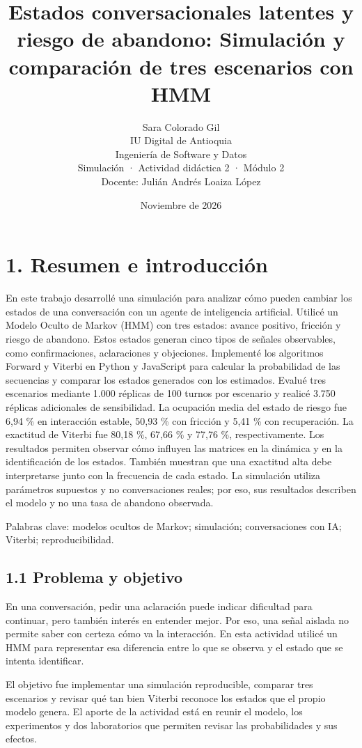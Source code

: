\documentclass[10pt,a4paper]{article}
\title{Estados conversacionales latentes y riesgo de abandono: Simulación y comparación de tres escenarios con HMM}
\author{Sara Colorado Gil\\IU Digital de Antioquia\\Ingeniería de Software y Datos\\Simulación · Actividad didáctica 2 · Módulo 2\\Docente: Julián Andrés Loaiza López}
\date{Noviembre de 2026}
\begin{document}
\maketitle\newpage
\section*{1. Resumen e introducción}
En este trabajo desarrollé una simulación para analizar cómo pueden cambiar los estados de una conversación con un agente de inteligencia artificial. Utilicé un Modelo Oculto de Markov (HMM) con tres estados: avance positivo, fricción y riesgo de abandono. Estos estados generan cinco tipos de señales observables, como confirmaciones, aclaraciones y objeciones. Implementé los algoritmos Forward y Viterbi en Python y JavaScript para calcular la probabilidad de las secuencias y comparar los estados generados con los estimados. Evalué tres escenarios mediante 1.000 réplicas de 100 turnos por escenario y realicé 3.750 réplicas adicionales de sensibilidad. La ocupación media del estado de riesgo fue 6,94 \% en interacción estable, 50,93 \% con fricción y 5,41 \% con recuperación. La exactitud de Viterbi fue 80,18 \%, 67,66 \% y 77,76 \%, respectivamente. Los resultados permiten observar cómo influyen las matrices en la dinámica y en la identificación de los estados. También muestran que una exactitud alta debe interpretarse junto con la frecuencia de cada estado. La simulación utiliza parámetros supuestos y no conversaciones reales; por eso, sus resultados describen el modelo y no una tasa de abandono observada.


Palabras clave: modelos ocultos de Markov; simulación; conversaciones con IA; Viterbi; reproducibilidad.


\subsection*{1.1 Problema y objetivo}
En una conversación, pedir una aclaración puede indicar dificultad para continuar, pero también interés en entender mejor. Por eso, una señal aislada no permite saber con certeza cómo va la interacción. En esta actividad utilicé un HMM para representar esa diferencia entre lo que se observa y el estado que se intenta identificar.


El objetivo fue implementar una simulación reproducible, comparar tres escenarios y revisar qué tan bien Viterbi reconoce los estados que el propio modelo genera. El aporte de la actividad está en reunir el modelo, los experimentos y dos laboratorios que permiten revisar las probabilidades y sus efectos.
\end{document}
